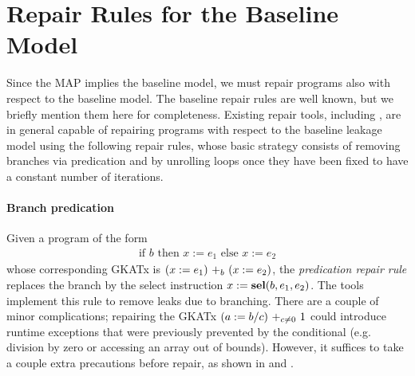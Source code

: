 {\color{red}


\section{Repair Rules for the Baseline Model}
Since the MAP implies the baseline model, we must repair programs also with respect to the baseline model. The baseline repair rules are well known, but we briefly mention them here for completeness. Existing repair tools, including \cite{Racoon,SCEliminator,MSESC}, are in general capable of repairing programs with respect to the baseline leakage model using the following repair rules, whose basic strategy consists of removing branches via {predication} and by unrolling loops once they have been fixed to have a constant number of iterations. 

\paragraph*{Branch predication} Given a program of the form 
\begin{align*}
    \text{if $b$ then $x:=e_1$ else $x:=e_2$}
\end{align*}
whose corresponding GKATx is $\branch{b}{(x:=e_1)}{(x:=e_2)}$, the \emph{predication repair rule} replaces the branch by the select instruction $x:=\sel(b,e_1,e_2)$. The tools \cite{Racoon,SCEliminator,MSESC} implement this rule to remove leaks due to branching.
There are a couple of minor complications; repairing the GKATx $\branch{c\neq0}{(a:=b/c)}{1}$
could introduce runtime exceptions that were previously prevented by the conditional (e.g. division by zero or accessing an array out of bounds). However, it suffices to take a couple extra precautions before repair, as shown in \cite{Racoon} and \cite{MSESC}. 



}

